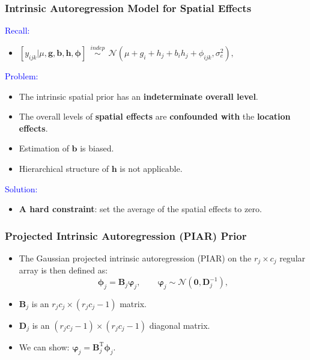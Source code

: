 \documentclass{beamer}
\newcommand{\bB}{\mathbf{B}}
\newcommand{\bD}{\mathbf{D}}
\newcommand{\bphi}{{\bm\phi}}
\newcommand{\bvarphi}{{\bm\varphi}}
\newcommand{\sT}{\mathrm{T}}
\begin{document}
\begin{frame}
	\frametitle{Intrinsic Autoregression Model for Spatial Effects}

\textcolor{blue}{Recall: } 
\begin{itemize}
\item $[y_{ijk} | \mu, \mathbf{g}, \mathbf{b}, \mathbf{h}, \bphi ] \ \ \overset{indep}{\sim} \ \  \mathcal{N}(\mu + g_i + h_j + b_i h_j + \phi_{ijk}, \sigma_e^2), $
\end{itemize}

\pause
	
\textcolor{blue}{Problem: }
\begin{itemize}
\item The intrinsic spatial prior has an \textbf{indeterminate overall level}.
\item The overall levels of \textbf{spatial effects} are \textbf{confounded with} the \textbf{location effects}.
\item Estimation of $\mathbf{b}$ is biased.
\item Hierarchical structure of $\mathbf{h}$ is not applicable.
\end{itemize}

\pause
\textcolor{blue}{Solution: }
	\begin{itemize}
\item  \textbf{A hard constraint}:  set the average of the spatial effects to zero.
\end{itemize}
 
\end{frame}




\begin{frame}
	\frametitle{Projected Intrinsic Autoregression (PIAR) Prior}

  	\begin{itemize}
	\item The Gaussian projected intrinsic autoregression (PIAR) on the $r_j \times c_j$ regular array is then defined as:
	\begin{equation*}
\bphi_j = \bB_j \bvarphi_j,\qquad \bvarphi_j\sim{\mathcal N}(\mathbf{0},\bD_j^{-1}),
\end{equation*}
\item  $\bB_{j}$ is an $r_jc_j \times (r_jc_j-1)$ matrix.
\item $\bD_j$ is an $(r_jc_j-1) \times (r_jc_j-1)$ diagonal matrix. 
\item We can show: $\bvarphi_j = \bB_j^\sT \bphi_j$.
	\end{itemize}
	
\end{frame}
\end{document}

